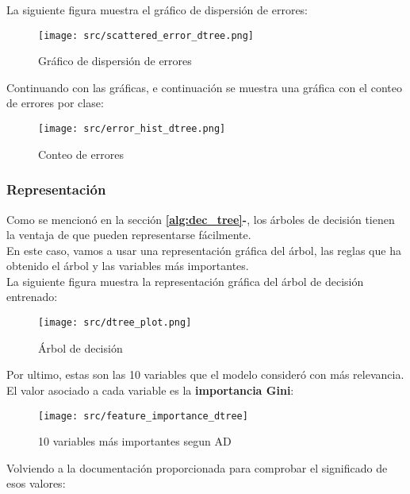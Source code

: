 La siguiente figura muestra el gráfico de dispersión de errores:\\
\begin{figure}[H]
	\centering
	\texttt{[image: src/scattered\_error\_dtree.png]}
	\caption{Gráfico de dispersión de errores}
	\label{fig:tree_scattered}
\end{figure}
Continuando con las gráficas, e continuación se muestra una gráfica con el conteo de errores por clase:
\begin{figure}[H]
	\centering
	\texttt{[image: src/error\_hist\_dtree.png]}
	\caption{Conteo de errores}
	\label{fig:tree_error_plot}
\end{figure}
\subsubsection*{Representación}
Como se mencionó en la sección \textbf{\ref{alg:dec_tree}-}, los árboles de decisión tienen la ventaja de que pueden representarse fácilmente. \\
En este caso, vamos a usar una representación gráfica del árbol, las reglas que ha obtenido el árbol y las variables más importantes.\\
\linebreak
La siguiente figura muestra la representación gráfica del árbol de decisión entrenado:\\
\linebreak
\begin{figure}[H]
	\centering
	\texttt{[image: src/dtree\_plot.png]}
	\caption{Árbol de decisión}
	\label{fig:decission_tree1}
\end{figure}
\pagebreak
Por ultimo, estas son las 10 variables que el modelo consideró con más relevancia. El valor asociado a cada variable es la \textbf{importancia Gini}:
\begin{figure}[H]
	\centering
	\texttt{[image: src/feature\_importance\_dtree]}
	\caption{10 variables más importantes segun AD}
	\label{fig:feature_dtree}
\end{figure}
Volviendo a la documentación proporcionada para comprobar el significado de esos valores:
